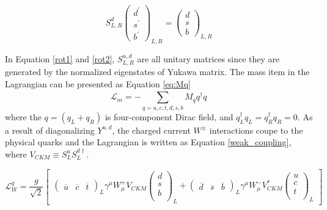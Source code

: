\begin{equation}\label{rot2}
S_{L,R}^{d}
\begin{pmatrix}
d^\prime   \\
s^\prime  \\
b^\prime 
\end{pmatrix}_{L,R}
= \begin{pmatrix}
d  \\
s  \\
b 
\end{pmatrix}_{L,R}
\end{equation}


 In Equation \ref{rot1} and \ref{rot2}, $S^{u,d}_{L,R}$ are all unitary matrices since they are generated by the normalized eigenstates of Yukawa matrix. The mass
  item in the Lagrangian can be presented as Equation \ref{eq:Mq}
\begin{equation}\label{eq:Mq}
\mathcal{L}_{m} = -\sum_{q=u,c,t,d,s,b}^{} M_q q^{\dag}_{} q_{}
\end{equation}
where the $q=(q_L+q_R)$ is four-component Dirac field, and $q_L^\dag q_L = q_R^\dag q_R = 0$. 
As a result of diagonalizing $Y^{u,d}$,  the charged current $W^{\pm}$ interactions coupe to the physical quarks and the Lagrangian is written as Equation \ref{weak_coupling}, where $V_{CKM} \equiv S_L^u S_L^{d\dag}$.

\begin{equation}\label{weak_coupling}
\mathcal{L}^q_W = \frac{g}{\sqrt{2}}
\begin{bmatrix}
\begin{pmatrix}
\overline{u}&\overline{c}&\overline{t}
\end{pmatrix}_L

\gamma^\mu W^{+}_{\mu}
V_{CKM}
\begin{pmatrix}
d\\s\\b\\
\end{pmatrix}_L+
\begin{pmatrix}
\overline{d}&\overline{s}&\overline{b}
\end{pmatrix}_L
\gamma^\mu W^{-}_{\mu}
V_{CKM}^{*}
\begin{pmatrix}
u\\c\\t\\
\end{pmatrix}_L
\end{bmatrix}
\end{equation}

